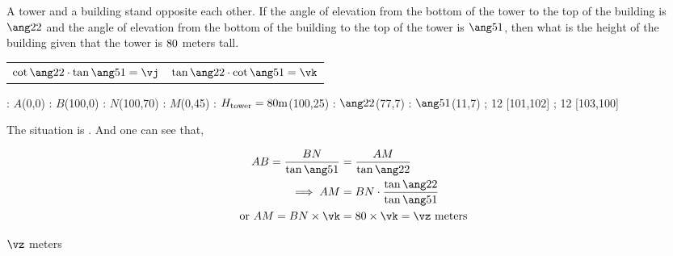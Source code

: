 

\DEGREESCOT\va\vc
\DEGREESCOT\vb\vd
\DEGREESTAN\va\vx
\DEGREESTAN\vb\vy

\MULTIPLY\vc\vy\vm %
\MULTIPLY\vd\vx\vn%

\ROUND[2]\vm\vj
\ROUND[2]\vn\vk
\MULTIPLY\vh\vk\vl
\ROUND[2]\vl\vz

\question[2] A tower and a building stand opposite each other. If the angle of elevation
from the bottom of the tower to the top of the building is $\ang\va$ and the angle
of elevation from the bottom of the building to the top of the tower is $\ang\vb$, then
what is the height of the building given that the tower is $80$ meters tall.

\watchout

\begin{calcaid}
  \begin{tabular}{c c}
    $\cot\ang\va\cdot\tan\ang\vb=\vj$ & $\tan\ang\va\cdot\cot\ang\vb=\vk$
  \end{tabular}
\end{calcaid}

\ifprintanswers
  \vspace{0.7cm}
    : $A$(0,0)
    : $B$(100,0)
    : $N$(100,70)
    : $M$(0,45)
    : $H_{\text{tower}} = 80\text{m}$(100,25)
    : $\ang\va$(77,7)
    : $\ang\vb$(11,7)
  \figdrawbegin{}
    \figdrawline [100,101,102,100]
    \figdrawline [101,103,100]
     ; 12 [101,102] 
     ; 12 [103,100] 
  \figdrawend
  \centerline{\box\figBoxA}
\fi 

\begin{solution}[\halfpage]
	The situation is \asif. And one can see that,
	
	\begin{align}
		AB = \dfrac{BN}{\tan\ang\vb} &= \dfrac{AM}{\tan\ang\va} \\
    \implies AM &= BN\cdot\dfrac{\tan\ang\va}{\tan\ang\vb} \\
		\text{or } AM = BN\times\vk &= \vh\times\vk = \vz\text{ meters}
	\end{align}
\end{solution}

\ifprintanswers\begin{codex}$\vz$ meters\end{codex}\fi
